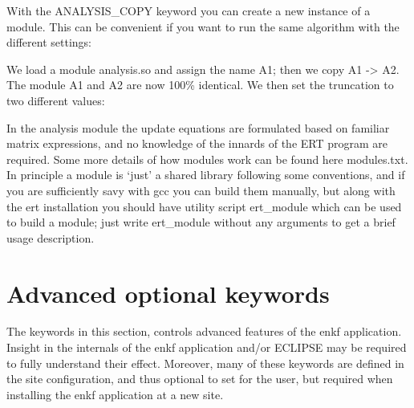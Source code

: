 \documentclass[a4paper,10pt,english]{sphinxmanual}
\begin{document}
\label{\detokenize{keywords/index:analysis-copy}}
\begin{sphinxShadowBox}

With the ANALYSIS\_COPY keyword you can create a new instance of a module. This
can be convenient if you want to run the same algorithm with the different
settings:

%
\begin{sphinxVerbatim}[commandchars=\\\{\}]
     
    
\end{sphinxVerbatim}

We load a module analysis.so and assign the name A1; then we copy A1 -\textgreater{} A2.
The module A1 and A2 are now 100\% identical. We then set the truncation to two
different values:

%
\begin{sphinxVerbatim}[commandchars=\\\{\}]
   
   
\end{sphinxVerbatim}
\end{sphinxShadowBox}


In the analysis module the update equations are formulated based on familiar
matrix expressions, and no knowledge of the innards of the ERT program are
required. Some more details of how modules work can be found here modules.txt.
In principle a module is ‘just’ a shared library following some conventions, and
if you are sufficiently savy with gcc you can build them manually, but along
with the ert installation you should have utility script ert\_module which can be
used to build a module; just write ert\_module without any arguments to get a
brief usage description.


\section{Advanced optional keywords}
\label{\detokenize{keywords/index:advanced-optional-keywords}}\label{\detokenize{keywords/index:id11}}
The keywords in this section, controls advanced features of the enkf
application. Insight in the internals of the enkf application and/or ECLIPSE may
be required to fully understand their effect. Moreover, many of these keywords
are defined in the site configuration, and thus optional to set for the user,
but required when installing the enkf application at a new site.
\end{document}
